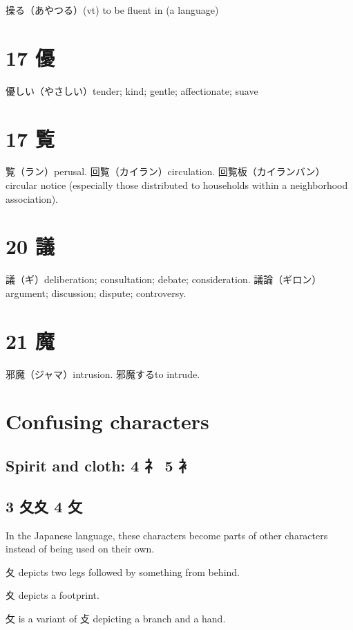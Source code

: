 操る（あやつる）(vt) to be fluent in (a language)

\section{17 優}

優しい（やさしい）tender; kind; gentle; affectionate; suave

\section{17 覧}

覧（ラン）perusal.
回覧（カイラン）circulation.
回覧板（カイランバン）circular notice
(especially those distributed to households within a neighborhood association).

\section{20 議}

議（ギ）deliberation; consultation; debate; consideration.
議論（ギロン）argument; discussion; dispute; controversy.

\section{21 魔}

邪魔（ジャマ）intrusion.
邪魔するto intrude.

\section{Confusing characters}

\subsection{Spirit and cloth: 4 礻 5 衤}

\subsection{3 夂夊 4 攵}

In the Japanese language,
these characters become parts of other characters
instead of being used on their own.

夂 depicts two legs followed by something from behind.

夊 depicts a footprint.

攵 is a variant of 攴 depicting a branch and a hand.

